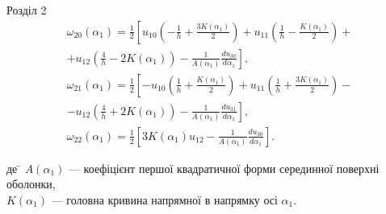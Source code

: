 \documentclass[handout, 8pt]{beamer}
\numberwithin{figure}{section}
\numberwithin{equation}{section}
\numberwithin{table}{section}
\begin{document}
\begin{frame}{Розділ 2}
\begin{equation}\label{eq:sqt_strain_ang}
\begin{aligned}
\omega_{20}\left(\alpha_1\right)=\frac12 
\left[
u_{10}
\left( -\frac{1}{h}+\frac{3K\left( \alpha_1 \right)}{2} \right)
+u_{11}\left( \frac{1}{h}-\frac{K\left( \alpha_1 \right)}{2} \right)+\right.\\
\left.
+u_{12}\left( \frac{4}{h}-2K\left( \alpha_1 \right) \right)
 - \frac{1}{A\left(\alpha_1\right)}\frac{du_{30}}{d\alpha_1}
\right],\\
\omega_{21}\left(\alpha_1\right)=\frac12 
\left[
-u_{10}
\left( \frac{1}{h}+\frac{K\left( \alpha_1 \right)}{2} \right)
+u_{11}\left( \frac{1}{h}+\frac{3K\left( \alpha_1 \right)}{2} \right)-\right.\\
\left.
-u_{12}\left( \frac{4}{h}+2K\left( \alpha_1 \right) \right)
 - \frac{1}{A\left(\alpha_1\right)}\frac{du_{31}}{d\alpha_1}
\right],\\
\omega_{22}\left(\alpha_1\right)=\frac12 
\left[3K\left( \alpha_1 \right)u_{12}
 - \frac{1}{A\left(\alpha_1\right)}\frac{du_{30}}{d\alpha_1}
\right].
\end{aligned}
\end{equation}

\begin{tabbing}
де \= $  A \left( \alpha_1 \right)$ --- коефіцієнт першої квадратичної форми серединної поверхні оболонки,\\
\> $K \left( \alpha_1 \right)$ --- головна кривина напрямної в напрямку осі $\alpha_1$.
\end{tabbing}

\end{frame}
\end{document}

